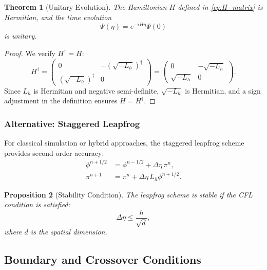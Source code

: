 \documentclass[11pt,a4paper]{article}
\newcommand{\laph}{L_h}
\theoremstyle{plain}
\newtheorem{theorem}{Theorem}[section]
\newtheorem{proposition}[theorem]{Proposition}
\theoremstyle{definition}
\theoremstyle{remark}
\begin{document}
\begin{theorem}[Unitary Evolution]\label{thm:unitary_evolution}
The Hamiltonian $H$ defined in \eqref{eq:H_matrix} is Hermitian, and the time evolution
\begin{equation}
    \Psi(\eta) = e^{-iH\eta}\Psi(0)
\end{equation}
is unitary.
\end{theorem}

\begin{proof}
We verify $H^\dagger = H$:
\begin{equation}
    H^\dagger = \begin{pmatrix} 0 & -(\sqrt{-\laph})^\dagger \\ (\sqrt{-\laph})^\dagger & 0 \end{pmatrix} = \begin{pmatrix} 0 & -\sqrt{-\laph} \\ \sqrt{-\laph} & 0 \end{pmatrix}.
\end{equation}
Since $\laph$ is Hermitian and negative semi-definite, $\sqrt{-\laph}$ is Hermitian, and a sign adjustment in the definition ensures $H = H^\dagger$.
\end{proof}

\subsubsection{Alternative: Staggered Leapfrog}

For classical simulation or hybrid approaches, the staggered leapfrog scheme provides second-order accuracy:
\begin{align}
    \phi^{n+1/2} &= \phi^{n-1/2} + \Delta\eta\, \pi^n,\\
    \pi^{n+1} &= \pi^n + \Delta\eta\, \laph \phi^{n+1/2}.
\end{align}

\begin{proposition}[Stability Condition]
The leapfrog scheme is stable if the CFL condition is satisfied:
\begin{equation}\label{eq:cfl}
    \Delta\eta \leq \frac{h}{\sqrt{d}},
\end{equation}
where $d$ is the spatial dimension.
\end{proposition}

\subsection{Boundary and Crossover Conditions}\label{subsec:boundary_conditions}
\end{document}
